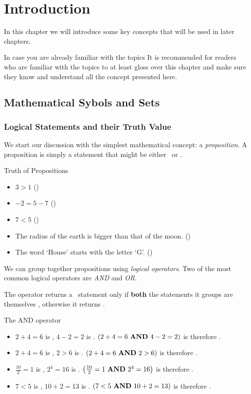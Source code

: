 \chapter{Introduction}
In this chapter we will introduce some key concepts that will be used in later chapters.

\begin{note}{In case you are already familiar with the topics}{}
	It is recommended for readers who are familiar with the topics to at least gloss over this chapter and make sure they know and understand all the concept presented here.
\end{note}

\section{Mathematical Sybols and Sets}
\subsection{Logical Statements and their Truth Value}
We start our discussion with the simplest mathematical concept: a \emph{proposition}. A proposition is simply a statement that might be either \true\ or \false.
\begin{example}{Truth of Propositions}{}
	\begin{itemize}
		\item $3>1$ (\true)
		\item $-2=5-7$ (\true)
		\item $7<5$ (\false)
		\item The radius of the earth is bigger than that of the moon. (\true)
		\item The word `House' starts with the letter `G'. (\false)
	\end{itemize}
\end{example}

We can group together propositions using \emph{logical operators}. Two of the most common logical operators are \emph{AND} and \emph{OR}.

The \AND{} operator returns a \true\ statement only if \textbf{both} the statements it groups are themselves \true, otherwise it returns \false.

\begin{example}{The AND operator}{}
	\begin{itemize}
		\item $2+4=6$ is \true, $4-2=2$ is \true. $\left(2+4=6\ \text{\AND{}}\ 4-2=2\right)$ is therefore \true.
		\item $2+4=6$ is \true, $2>6$ is \false. $\left(2+4=6\ \text{\AND{}}\ 2>6\right)$ is therefore \false.
		\item $\frac{10}{2}=1$ is \false, $2^{4}=16$ is \true. $\left( \frac{10}{2}=1\ \text{\AND{}}\ 2^{4}=16 \right)$ is therefore \false.
		\item $7<5$ is \false, $10+2=13$ is \false. $\left( 7<5\ \text{\textbf{AND}{}}\ 10+2=13 \right)$ is therefore \false.
	\end{itemize}
\end{example}

